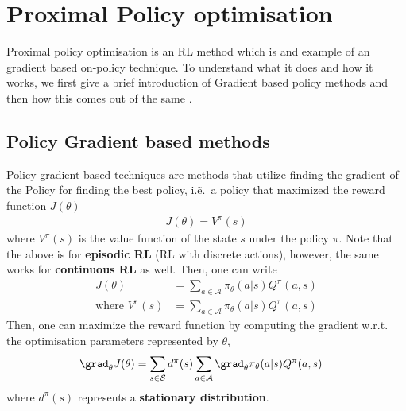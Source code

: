 \chapter{Proximal Policy optimisation}
Proximal policy optimisation is an RL method which is and example of an gradient based on-policy technique. To understand what it does and how it works, we first give a brief introduction of Gradient based policy methods and then how this comes out of the same \cite{lilianwengPolicyGradient,Sutton:Intro_to_RL_second_ed}.
\section{Policy Gradient based methods }
Policy gradient based techniques are methods that utilize finding the gradient of the Policy for finding the best policy, i.\~e.\ a policy that maximized the reward function $J(\theta)$~\cite{}
\begin{align}
    J(\theta) =  V^{\pi}(s)
\end{align}
where $V^{\pi}(s)$ is the value function of the state $s$ under the policy $\pi$. Note that the above is for \textbf{episodic RL} (RL with discrete actions), however, the same works for \textbf{continuous RL} as well.
Then, one can write 
\begin{align}
    J(\theta) &=\sum_{a \in \mathcal{A}} \pi_{\theta}(a|s) Q^{\pi}(a,s) \\
    \text{where } V^{\pi}(s) &= \sum_{a \in \mathcal{A}} \pi_{\theta}(a|s) Q^{\pi}(a,s) 
\end{align} 
Then, one can maximize the reward function by computing the gradient w.r.t. the optimisation parameters represented by  $\theta$,
\begin{align}\label{eq:Gradient_theorem}
    \grad_{\theta} J(\theta) &= \sum_{s\in \mathcal{S}} d^{\pi}(s) \sum_{a \in \mathcal{A}}\grad_{\theta} \pi_{\theta}(a|s) Q^{\pi}(a,s)
\end{align}
where $d^{\pi}(s)$ represents a \textbf{stationary distribution}.

